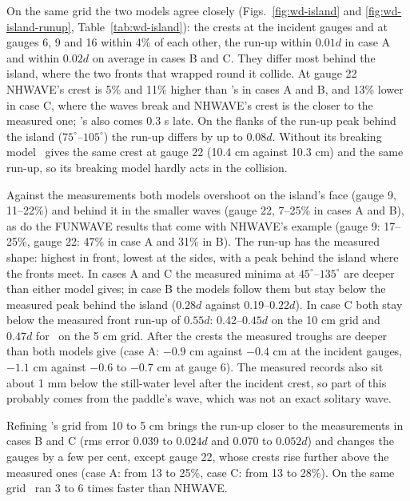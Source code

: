 On the same grid the two models agree closely (Figs.~\ref{fig:wd-island} and
\ref{fig:wd-island-runup}, Table~\ref{tab:wd-island}): the crests at the
incident gauges and at gauges 6, 9 and 16 within 4\% of each other, the run-up
within $0.01d$ in case A and within $0.02d$ on average in cases B and C. They
differ most behind the island, where the two fronts that wrapped round it
collide. At gauge 22 NHWAVE's crest is 5\% and 11\% higher than \NHFOAM's in
cases A and B, and 13\% lower in case C, where the waves break and NHWAVE's
crest is the closer to the measured one; \NHFOAM's also comes 0.3 s late. On
the flanks of the run-up peak behind the island ($75^\circ$--$105^\circ$) the
run-up differs by up to $0.08d$. Without its breaking model \NHFOAM\ gives the
same crest at gauge 22 (10.4 cm against 10.3 cm) and the same run-up, so its
breaking model hardly acts in the collision.

Against the measurements both models overshoot on the island's face (gauge 9,
11--22\%) and behind it in the smaller waves (gauge 22, 7--25\% in cases A and
B), as do the FUNWAVE results that come with NHWAVE's example (gauge 9: 17--25\%,
gauge 22: 47\% in case A and 31\% in B). The run-up has the measured shape:
highest in front, lowest at the sides, with a peak behind the island where the
fronts meet. In cases A and C the measured minima at $45^\circ$--$135^\circ$
are deeper than either model gives; in case B the models follow them but stay
below the measured peak behind the island ($0.28d$ against 0.19--$0.22d$). In
case C both stay below the measured front run-up of $0.55d$: 0.42--$0.45d$ on
the 10 cm grid and $0.47d$ for \NHFOAM\ on the 5 cm grid. After the crests the
measured troughs are deeper than both models give (case A: $-0.9$ cm against
$-0.4$ cm at the incident gauges, $-1.1$ cm against $-0.6$ to $-0.7$ cm at
gauge 6). The measured records also sit about 1 mm below the still-water level
after the incident crest, so part of this probably comes from the paddle's
wave, which was not an exact solitary wave.

Refining \NHFOAM's grid from 10 to 5 cm brings the run-up closer to the
measurements in cases B and C (rms error 0.039 to $0.024d$ and 0.070 to
$0.052d$) and changes the gauges by a few per cent, except gauge 22, whose
crests rise further above the measured ones (case A: from 13 to 25\%, case C:
from 13 to 28\%). On the same grid \NHFOAM\ ran 3 to 6 times faster than
NHWAVE.

